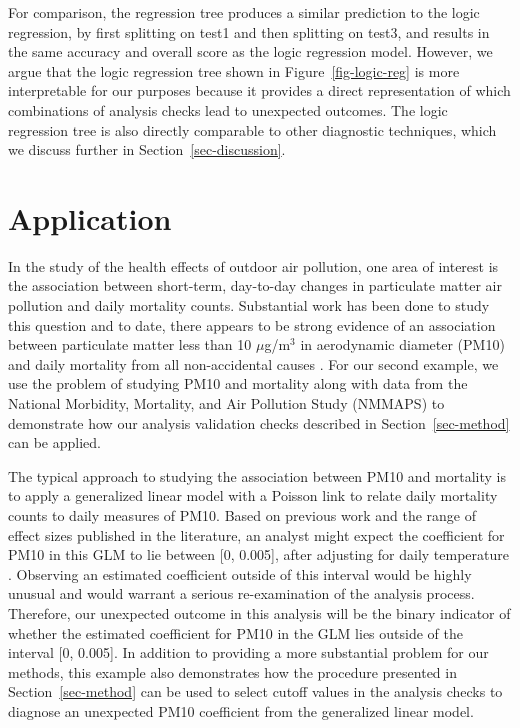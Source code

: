 \documentclass[
  12pt,
]{interact}
\begin{document}
For comparison, the regression tree produces a similar prediction to the
logic regression, by first splitting on test1 and then splitting on
test3, and results in the same accuracy and overall score as the logic
regression model. However, we argue that the logic regression tree shown
in Figure~\ref{fig-logic-reg} is more interpretable for our purposes
because it provides a direct representation of which combinations of
analysis checks lead to unexpected outcomes. The logic regression tree
is also directly comparable to other diagnostic techniques, which we
discuss further in Section~\ref{sec-discussion}.

\section{Application}\label{sec-pm10-mortality}

In the study of the health effects of outdoor air pollution, one area of
interest is the association between short-term, day-to-day changes in
particulate matter air pollution and daily mortality counts. Substantial
work has been done to study this question and to date, there appears to
be strong evidence of an association between particulate matter less
than 10 \(\mu\)g/m\(^3\) in aerodynamic diameter (PM10) and daily
mortality from all non-accidental causes \citep{samet2000fine}. For our
second example, we use the problem of studying PM10 and mortality along
with data from the National Morbidity, Mortality, and Air Pollution
Study (NMMAPS) to demonstrate how our analysis validation checks
described in Section~\ref{sec-method} can be applied.

The typical approach to studying the association between PM10 and
mortality is to apply a generalized linear model with a Poisson link to
relate daily mortality counts to daily measures of PM10. Based on
previous work and the range of effect sizes published in the literature,
an analyst might expect the coefficient for PM10 in this GLM to lie
between {[}0, 0.005{]}, after adjusting for daily temperature
\citep{samet200fine, welty2005acute}. Observing an estimated coefficient
outside of this interval would be highly unusual and would warrant a
serious re-examination of the analysis process. Therefore, our
unexpected outcome in this analysis will be the binary indicator of
whether the estimated coefficient for PM10 in the GLM lies outside of
the interval {[}0, 0.005{]}. In addition to providing a more substantial
problem for our methods, this example also demonstrates how the
procedure presented in Section~\ref{sec-method} can be used to select
cutoff values in the analysis checks to diagnose an unexpected PM10
coefficient from the generalized linear model.
\end{document}
